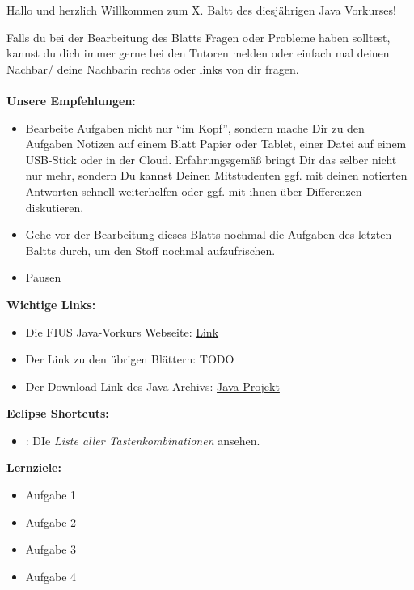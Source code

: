 
\begin{center}
	Hallo und herzlich Willkommen zum X. Baltt des diesjährigen Java Vorkurses!\\
\end{center}

Falls du bei der Bearbeitung des Blatts Fragen oder Probleme haben solltest, kannst du dich immer gerne bei den Tutoren melden oder einfach mal deinen Nachbar/ deine Nachbarin rechts oder links von dir fragen.\\\\

\textbf{Unsere Empfehlungen:}
\begin{itemize}
	\item Bearbeite Aufgaben nicht nur \enquote{im Kopf}, sondern mache Dir zu den Aufgaben Notizen auf einem Blatt Papier oder Tablet, einer Datei auf einem USB-Stick oder in der Cloud. Erfahrungsgemäß bringt Dir das selber nicht nur mehr, sondern Du kannst Deinen Mitstudenten ggf. mit deinen notierten Antworten schnell weiterhelfen oder ggf. mit ihnen über Differenzen diskutieren.
	\item Gehe vor der Bearbeitung dieses Blatts nochmal die Aufgaben des letzten Baltts durch, um den Stoff nochmal aufzufrischen.
	\item Pausen
\end{itemize}

\textbf{Wichtige Links:}
\begin{itemize}
	\item Die FIUS Java-Vorkurs Webseite: \href{\fiusjvk}{Link}
	\item Der Link zu den übrigen Blättern: TODO
	\item Der Download-Link des Java-Archivs: \href{\jvkpackageurl}{Java-Projekt}
\end{itemize}

\textbf{Eclipse Shortcuts:}
\begin{itemize}
	\item {}: DIe \textit{Liste aller Tastenkombinationen} ansehen.
\end{itemize}
\vskip1cm
\textbf{Lernziele:}
\begin{itemize}
	\item  Aufgabe 1	%
	\item  Aufgabe 2	%
	\item  Aufgabe 3	%
	\item  Aufgabe 4	%
\end{itemize}
